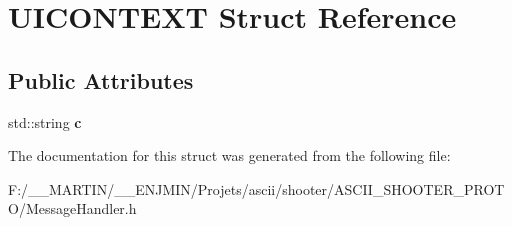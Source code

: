 \hypertarget{struct_u_i_c_o_n_t_e_x_t}{}\section{U\+I\+C\+O\+N\+T\+E\+XT Struct Reference}
\label{struct_u_i_c_o_n_t_e_x_t}
\subsection*{Public Attributes}
\begin{DoxyCompactItemize}
\item 
\hypertarget{struct_u_i_c_o_n_t_e_x_t_a672622d159e94c8ac6474c49fc239324}{}\label{struct_u_i_c_o_n_t_e_x_t_a672622d159e94c8ac6474c49fc239324} 
std\+::string {\bfseries c}
\end{DoxyCompactItemize}


The documentation for this struct was generated from the following file\+:\begin{DoxyCompactItemize}
\item 
F\+:/\+\_\+\+\_\+\+M\+A\+R\+T\+I\+N/\+\_\+\+\_\+\+E\+N\+J\+M\+I\+N/\+Projets/ascii/shooter/\+A\+S\+C\+I\+I\+\_\+\+S\+H\+O\+O\+T\+E\+R\+\_\+\+P\+R\+O\+T\+O/Message\+Handler.\+h\end{DoxyCompactItemize}
